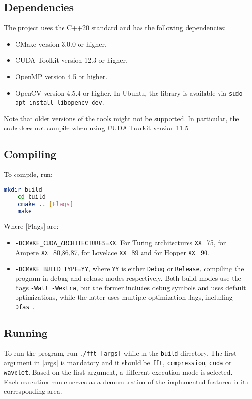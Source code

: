 \subsection{Dependencies}
The project uses the C++20 standard and has the following dependencies:
\begin{itemize}
    \item CMake version 3.0.0 or higher.
    \item CUDA Toolkit version 12.3 or higher. 
    \item OpenMP version 4.5 or higher.
    \item OpenCV version 4.5.4 or higher. In Ubuntu, the library is available via \texttt{sudo apt install libopencv-dev}.
\end{itemize}
Note that older versions of the tools might not be supported. In particular, the code does not compile when using CUDA Toolkit version 11.5.

\subsection{Compiling}
To compile, run:
\begin{lstlisting}[language=Bash]
    mkdir build
    cd build
    cmake .. [Flags]
    make
\end{lstlisting}
Where [Flags] are:
\begin{itemize}
    \item \texttt{-DCMAKE\_CUDA\_ARCHITECTURES=XX}. For Turing architectures \texttt{XX}=75, for Ampere \texttt{XX}=80,86,87, for Lovelace \texttt{XX}=89 and for Hopper \texttt{XX}=90. 
    \item \texttt{-DCMAKE\_BUILD\_TYPE=YY}, where \texttt{YY} is either \texttt{Debug} or \texttt{Release}, compiling the program in debug and release modes respectively. Both build modes use the flags \texttt{-Wall -Wextra}, but the former includes debug symbols and uses default optimizations, while the latter uses multiple optimization flags, including \texttt{-Ofast}. 
\end{itemize}

\subsection{Running}
To run the program, run \texttt{./fft [args]} while in the \texttt{build} directory. The first argument in [args] is mandatory and it should be \texttt{fft}, \texttt{compression}, \texttt{cuda} or \texttt{wavelet}. Based on the first argument, a different execution mode is selected. Each execution mode serves as a demonstration of the implemented features in its corresponding area.

